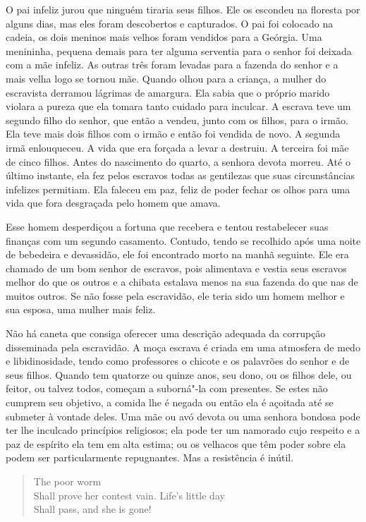 O pai infeliz jurou que ninguém tiraria seus filhos. Ele os escondeu na
floresta por alguns dias, mas eles foram descobertos e capturados. O pai
foi colocado na cadeia, os dois meninos mais velhos foram vendidos para
a Geórgia. Uma menininha, pequena demais para ter alguma serventia para
o senhor foi deixada com a mãe infeliz. As outras três foram levadas
para a fazenda do senhor e a mais velha logo se tornou mãe. Quando olhou
para a criança, a mulher do escravista derramou lágrimas de amargura.
Ela sabia que o próprio marido violara a pureza que ela tomara tanto
cuidado para inculcar. A escrava teve um segundo filho do senhor, que
então a vendeu, junto com os filhos, para o irmão. Ela teve mais dois
filhos com o irmão e então foi vendida de novo. A segunda irmã
enlouqueceu. A vida que era forçada a levar a destruiu. A terceira foi
mãe de cinco filhos. Antes do nascimento do quarto, a senhora devota
morreu. Até o último instante, ela fez pelos escravos todas as
gentilezas que suas circunstâncias infelizes permitiam. Ela faleceu em
paz, feliz de poder fechar os olhos para uma vida que fora desgraçada
pelo homem que amava.

Esse homem desperdiçou a fortuna que
recebera e tentou restabelecer suas finanças com um segundo casamento.
Contudo, tendo se recolhido após uma noite de bebedeira e devassidão,
ele foi encontrado morto na manhã seguinte. Ele era chamado de um bom
senhor de escravos, pois alimentava e vestia seus escravos melhor do que
os outros e a chibata estalava menos na sua fazenda do que nas de muitos
outros. Se não fosse pela escravidão, ele teria sido um homem melhor e
sua esposa, uma mulher mais feliz.

Não há caneta que consiga oferecer uma
descrição adequada da corrupção disseminada pela escravidão. A moça
escrava é criada em uma atmosfera de medo e libidinosidade, tendo como
professores o chicote e os palavrões do senhor e de seus filhos. Quando
tem quatorze ou quinze anos, seu dono, ou os filhos dele, ou feitor, ou
talvez todos, começam a suborná"-la com presentes. Se estes não cumprem
seu objetivo, a comida lhe é negada ou então ela é açoitada até se
submeter à vontade deles. Uma mãe ou avó devota ou uma senhora bondosa
pode ter lhe inculcado princípios religiosos; ela pode ter um namorado
cujo respeito e a paz de espírito ela tem em alta estima; ou os velhacos
que têm poder sobre ela podem ser particularmente repugnantes. Mas a
resistência é inútil.

\begin{verse}
\quad [\ldots{}] The poor worm\\
Shall prove her contest vain. Life's little day\\
\quad Shall pass, and she is gone!\footnotemark
\end{verse}

